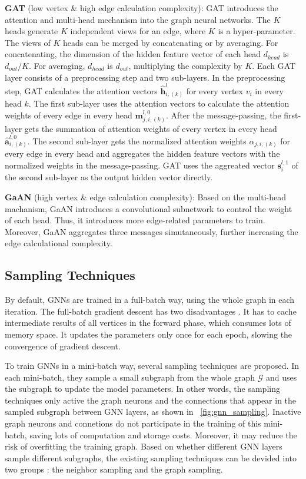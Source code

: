 \textbf{GAT} (low vertex \& high edge calculation complexity):
GAT introduces the attention and multi-head mechanism into the graph neural networks.
The $K$ heads generate $K$ independent views for an edge, where $K$ is a hyper-parameter.
The views of $K$ heads can be merged by concatenating or by averaging.
For concatenating, the dimension of the hidden feature vector of each head $d_{head}$ is $d_{out}/K$.
For averaging, $d_{head}$ is $d_{out}$, multiplying the complexity by $K$.
Each GAT layer consists of a preprocessing step and two sub-layers.
In the preprocessing step, GAT calculates the attention vectors $\hat{\boldsymbol{h}}^{l}_{i,(k)}$ for every vertex $v_i$ in every head $k$.
The first sub-layer uses the attention vectors to calculate the attention weights of every edge in every head $\boldsymbol{m}^{l,0}_{j,i,(k)}$.
After the message-passing, the first-layer gets the summation of attention weights of every vertex in every head $\hat{\boldsymbol{a}}^{l,0}_{i,(k)}$.
The second sub-layer gets the normalized attention weights $\alpha_{j, i, (k)}$ for every edge in every head and aggregates the hidden feature vectors with the normalized weights in the message-passing.
GAT uses the aggreated vector $\boldsymbol{s}^{l,1}_i$ of the second sub-layer as the output hidden vector directly.

\textbf{GaAN} (high vertex \& edge calculation complexity):
Based on the multi-head machanism, GaAN introduces a convolutional subnetwork to control the weight of each head.
Thus, it introduces more edge-related parameters to train.
Moreover, GaAN aggregates three messages simutaneously, further increasing the edge calculational complexity.

\subsection{Sampling Techniques}

By default, GNNs are trained in a full-batch way, using the whole graph in each iteration.
The full-batch gradient descent has two disadvantages \cite{chiang2019_cluster_gcn}.
It has to cache intermediate results of all vertices in the forward phase, which consumes lots of memory space.
It updates the parameters only once for each epoch, slowing the convergence of gradient descent.

To train GNNs in a mini-batch way, several sampling techniques \cite{chiang2019_cluster_gcn} are proposed.
In each mini-batch, they sample a small subgraph from the whole graph $\mathcal{G}$ and uses the subgraph to update the model parameters.
In other words, the sampling techniques only active the graph neurons and the connections that appear in the sampled subgraph between GNN layers, as shown in \figurename~\ref{fig:gnn_sampling}.
Inactive graph neurons and connetions do not participate in the training of this mini-batch, saving lots of computation and storage costs.
Moreover, it may reduce the risk of overfitting the training graph.
Based on whether different GNN layers sample different subgraphs, the existing sampling techniques can be devided into two groups \cite{zeng2020_graphsaint}: the neighbor sampling and the graph sampling.

